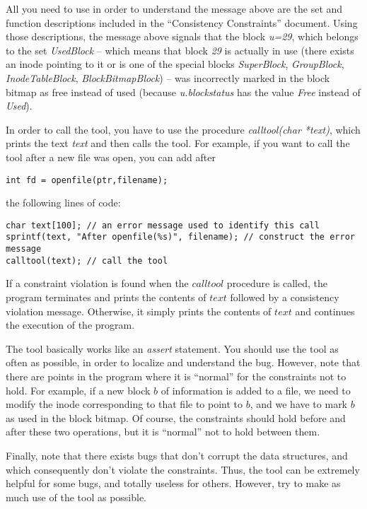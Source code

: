 \documentclass{article}
\begin{document}
\begin{flushleft}
All you need to use in order to understand the message above are the 
set and function descriptions included in the ``Consistency Constraints'' 
document. 
Using those descriptions, the message above signals that the block {\it u=29}, 
which belongs to the set {\it UsedBlock} -- 
which means that block {\it 29} is actually in use (there exists an inode 
pointing to it or is one of the special blocks {\it SuperBlock}, 
{\it GroupBlock}, {\it InodeTableBlock}, {\it BlockBitmapBlock}) 
-- was incorrectly marked in the block bitmap as free instead of used 
(because {\it u.blockstatus} has the value {\it Free} instead of {\it Used}).


\vspace{0.1in}
In order to call the tool, you have to use the procedure 
{\it calltool(char *text)}, which prints the text {\it text} and then 
calls the tool.   For example, if you want to call the tool after a new file
was open, you can add after
\begin{verbatim}
int fd = openfile(ptr,filename);
\end{verbatim}

the following lines of code:
\begin{verbatim}
char text[100]; // an error message used to identify this call
sprintf(text, "After openfile(%s)", filename); // construct the error message
calltool(text); // call the tool
\end{verbatim}

If a constraint violation is found when the $calltool$ procedure
is called, the program terminates and prints the contents of $text$ 
followed by a consistency violation message.
Otherwise, it simply prints the contents of $text$ and continues the execution 
of the program.

\vspace{0.1in}
The tool basically works like an {\it assert} statement. 
You should use the tool as often as possible, in order to localize and 
understand the bug.  However, note that there are points in the program
where it is ``normal'' for the constraints not to hold.  For example, 
if a new block $b$ of information is added to a file, we need to modify the 
inode corresponding to that file to point to $b$, and we have to mark $b$ as
used in the block bitmap. Of course, the constraints should hold before and
after these two operations, but it is ``normal'' not to hold  between them.


\vspace{0.1in}
Finally, note that there exists bugs that don't corrupt the data structures, 
and which consequently don't violate the constraints.   Thus, the tool can
be extremely helpful for some bugs, and totally useless for others. However,
try to make as much use of the tool as possible.


\end{flushleft}
\end{document}

